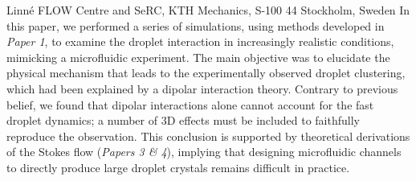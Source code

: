 %
%
%
%
%
%
%
\paperaffiliation
{%
  Linn\'e FLOW Centre and SeRC, KTH Mechanics, S-100 44 Stockholm, Sweden%
}%
%
%
%
%
%
\papernumber{}%
%
%
%
%
%
\papersummary%
{%
In this paper, we performed a series of simulations, using methods developed in \emph{Paper 1}, to examine the droplet interaction in increasingly realistic conditions, mimicking a microfluidic experiment. The main objective was to elucidate the physical mechanism that leads to the experimentally observed droplet clustering, which had been explained by a dipolar interaction theory. Contrary to previous belief, we found that dipolar interactions alone cannot account for the fast droplet dynamics; a number of 3D effects must be included to faithfully reproduce the observation. This conclusion is supported by theoretical derivations of the Stokes flow (\emph{Papers 3 \& 4}), implying that designing microfluidic channels to directly produce large droplet crystals remains difficult in practice.
}%
%
\graphicspath{{paper2/}}%
%
%
%
